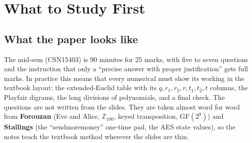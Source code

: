 \section{What to Study First}\label{sec:roadmap}

\subsection{What the paper looks like}
The mid-sem (CSN15403) is 90 minutes for 25 marks, with five to seven questions and the instruction that only a ``precise answer with proper justification'' gets full marks. In practice this means that every numerical must show its working in the textbook layout: the extended-Euclid table with its $q, r_1, r_2, r, t_1, t_2, t$ columns, the Playfair digrams, the long divisions of polynomials, and a final check. The questions are not written from the slides. They are taken almost word for word from \textbf{Forouzan} (Eve and Alice, $\mathbb{Z}_{100}$, keyed transposition, GF$(2^8)$) and \textbf{Stallings} (the ``sendmoremoney'' one-time pad, the AES state values), so the notes teach the textbook method wherever the slides are thin.

